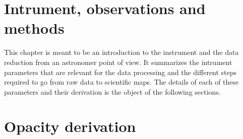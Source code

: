 \documentclass[a4paper, 11pt]{report}
\begin{document}
\clearpage
\chapter{Intrument, observations and methods}
\label{se:chap_instru_obs_methods}

This chapter is meant to be an introduction to the instrument and the data
reduction from an astronomer point of view. It summarizes the intrument
parameters that are relevant for the data processing and the different steps
required to go from raw data to scientific maps. The details of each of these
parameters and their derivation is the object of the following sections.









\clearpage
\chapter{Opacity derivation}%
\label{se:opacities}


\clearpage
\end{document}
